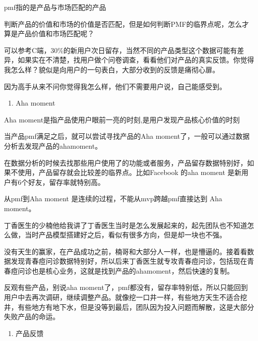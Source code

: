 \documentclass[letterpaper,11pt,english]{sphinxmanual}
\begin{document}
pmf指的是产品与市场匹配的产品

判断产品的价值和市场的价值是否匹配，但是如何判断PMF的临界点呢，怎么才算是产品价值和市场匹配呢？

可以参考C端，30\%的新用户次日留存，当然不同的产品类型这个数据可能有差异，如果实在不清楚，找用户做个问卷调查，看看他们对产品的真实反馈。你觉得我怎么样？貌似是向用户的一句表白，大部分收到的反馈是痛彻心扉。

因为高手从来不问你觉得我怎么样，他们不需要用户说，自己能感受到。
\begin{enumerate}
%
\setcounter{enumi}{2}
\item {} 
Aha moment

\end{enumerate}

Aha moment是指产品使用户眼前一亮的时刻,是用户发现产品核心价值的时刻

当产品pmf满足之后，就可以尝试寻找产品的Aha
moment了，一般可以通过数据分析去发现产品的ahamoment。

在数据分析的时候去找那些用户使用了的功能或者服务，产品留存数据特别好，如果不使用，产品留存就会比较差的临界点。比如Facebook
的aha moment 是新用户有6个好友，留存率就特别高。

从pmf到Aha moment 是连续的过程，不能从mvp跨越pmf直接达到 Aha moment。

丁香医生的少楠他给我讲了丁香医生当时是怎么发展起来的，起先团队也不知道怎么做，当时产品模型搭建好之后，看似有很多方向，但是却一块也不强。

没有天生的赢家，在产品成功之前，楠哥和大部分人一样，也是懵逼的。接着看数据发现青春痘问诊数据特别好，所以后来丁香医生就专攻青春痘问诊，包括现在青春痘问诊也是核心业务，这就是找到产品的ahamoment，然后快速的复制。

反观有些产品，别说aha
moment了，pmf都没有，留存率特别低，所以只能回到用户中去再次调研，继续调整产品。就像挖一口井一样，有些地方天生不适合挖井，有些地方有地下水，但是没等到最后，团队因为投入问题而解散，这是大部分失败产品的命运。
\begin{enumerate}
%
\item {} 
产品反馈
%
\begin{footnote}[750]\sphinxAtStartFootnote
{}
%
\end{footnote}

\end{enumerate}
\end{document}
